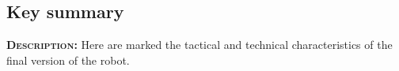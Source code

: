 \subsection{Key summary}
	\textsc{\textbf{Description:}} Here are marked the tactical and technical characteristics of the final version of the robot.\newline
	
	
  
\fillpage
